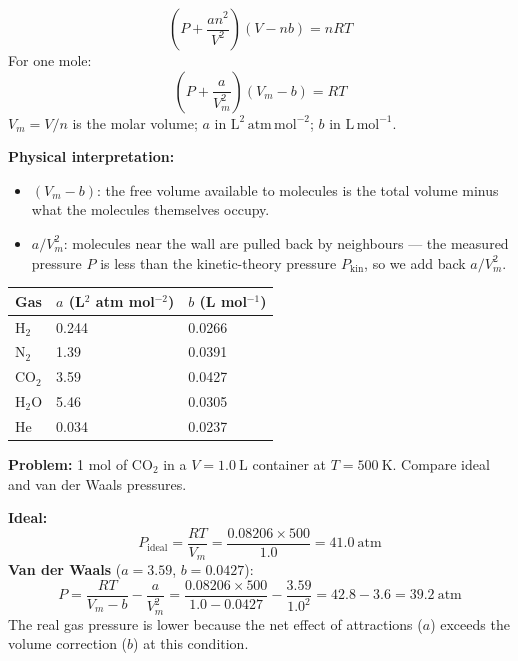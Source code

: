 \documentclass[12pt,a4paper]{article}
\begin{document}
\begin{tcolorbox}[formulabox, title={Van der Waals Equation}]
\[
\boxed{\left(P + \frac{an^2}{V^2}\right)(V - nb) = nRT}
\]
For one mole:
\[
\left(P + \frac{a}{V_m^2}\right)(V_m - b) = RT
\]
$V_m = V/n$ is the molar volume; $a$ in $\mathrm{L^2\,atm\,mol^{-2}}$; $b$ in $\mathrm{L\,mol^{-1}}$.
\end{tcolorbox}

\textbf{Physical interpretation:}
\begin{itemize}[leftmargin=*, itemsep=1pt, topsep=2pt]
  \item $(V_m - b)$: the free volume available to molecules is the total volume minus what the molecules themselves occupy.
  \item $a/V_m^2$: molecules near the wall are pulled back by neighbours --- the measured pressure $P$ is less than the kinetic-theory pressure $P_{\mathrm{kin}}$, so we add back $a/V_m^2$.
\end{itemize}

\begin{tabularx}{\linewidth}{|B{2.4cm}|Y|Y|}
\hline
\textbf{Gas} & \textbf{$a$ (L$^2$ atm mol$^{-2}$)} & \textbf{$b$ (L mol$^{-1}$)} \\
\hline
$\mathrm{H_2}$ & 0.244 & 0.0266 \\
\hline
$\mathrm{N_2}$ & 1.39  & 0.0391 \\
\hline
$\mathrm{CO_2}$ & 3.59 & 0.0427 \\
\hline
$\mathrm{H_2O}$ & 5.46 & 0.0305 \\
\hline
$\mathrm{He}$ & 0.034 & 0.0237 \\
\hline
\end{tabularx}

\begin{tcolorbox}[examplebox, title={Solved Example: Pressure of Real vs Ideal Gas}]
\textbf{Problem:} 1 mol of $\mathrm{CO_2}$ in a $V=1.0\ \mathrm{L}$ container at $T=500\ \mathrm{K}$. Compare ideal and van der Waals pressures.

\textbf{Ideal:}
\[
P_{\mathrm{ideal}} = \frac{RT}{V_m} = \frac{0.08206\times500}{1.0} = 41.0\ \mathrm{atm}
\]
\textbf{Van der Waals} ($a=3.59$, $b=0.0427$):
\[
P = \frac{RT}{V_m - b} - \frac{a}{V_m^2} = \frac{0.08206\times500}{1.0-0.0427} - \frac{3.59}{1.0^2}
= 42.8 - 3.6 = \mathbf{39.2}\ \mathrm{atm}
\]
The real gas pressure is lower because the net effect of attractions ($a$) exceeds the volume correction ($b$) at this condition.
\end{tcolorbox}
\end{document}
